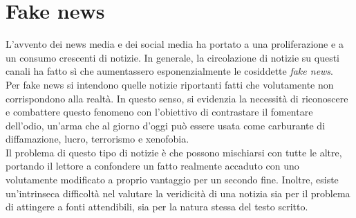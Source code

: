 \documentclass[12pt]{report}
\theoremstyle{definition}
\begin{document}
\section{Fake news} \label{fakenews}
L'avvento dei news media e dei social media ha portato a una proliferazione e a un consumo crescenti di notizie.
In generale, la circolazione di notizie su questi canali ha fatto sì che aumentassero esponenzialmente le cosiddette \textit{fake news}.
\\
Per fake news si intendono quelle notizie riportanti fatti che volutamente non corrispondono alla realtà.
In questo senso, si evidenzia la necessità di riconoscere e combattere questo fenomeno con l'obiettivo di contrastare il fomentare dell'odio, un'arma che al giorno d'oggi può essere usata come carburante di diffamazione, lucro, terrorismo e xenofobia.
\\
Il problema di questo tipo di notizie è che possono mischiarsi con tutte le altre, portando il lettore a confondere un fatto realmente accaduto con uno volutamente modificato a proprio vantaggio per un secondo fine.
Inoltre, esiste un'intrinseca difficoltà nel valutare la veridicità di una notizia sia per il problema di attingere a fonti attendibili, sia per la natura stessa del testo scritto.
\end{document}
